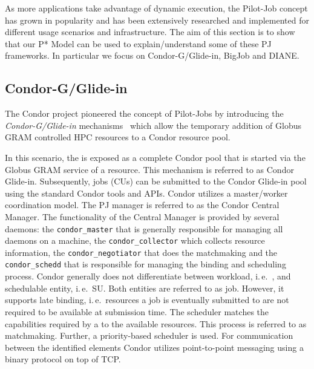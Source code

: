 \documentclass{sig-alternate}
\begin{document}
As more applications take advantage of dynamic execution, the
Pilot-Job concept has grown in popularity and has been extensively
researched and implemented for different usage scenarios and
infrastructure.  The aim of this section is to show that our P* Model
can be used to explain/understand some of these PJ frameworks. In
particular we focus on Condor-G/Glide-in, BigJob and DIANE.





\subsection{Condor-G/Glide-in}


The Condor project pioneered the concept of Pilot-Jobs by introducing 
the \textit{Condor-G/Glide-in} mechanisms~\cite{condor-g} which allow 
the temporary addition of Globus GRAM controlled HPC resources to a 
Condor resource pool.

In this scenario, the \pilot is exposed as a complete Condor pool that is started 
via the Globus GRAM service of a resource. This mechanism is referred to as Condor
Glide-in. Subsequently, jobs (CUs) can be submitted to the Condor Glide-in pool
using the standard Condor tools and APIs. Condor utilizes a
master/worker coordination model. The PJ manager is referred to as the
Condor Central Manager. The functionality of the Central Manager is
provided by several daemons: the \texttt{condor\_master} that is generally
responsible for managing all daemons on a machine, the
\texttt{condor\_collector} which collects resource information, the
\texttt{condor\_negotiator} that does the matchmaking and the \texttt{condor\_schedd}
that is responsible for managing the binding and scheduling
process. Condor generally does not differentiate between workload,
i.\,e.\ \cu, and schedulable entity, i.\,e.\ SU. Both entities are
referred to as job. However, it supports late binding, i.\,e.\
resources a job is eventually submitted to are not required to be available at
submission time. The scheduler matches the capabilities required by a
\cu to the available resources. This process is referred to as
matchmaking. Further, a priority-based scheduler is used. For
communication between the identified elements Condor utilizes
point-to-point messaging using a binary protocol on top of TCP.
\end{document}
